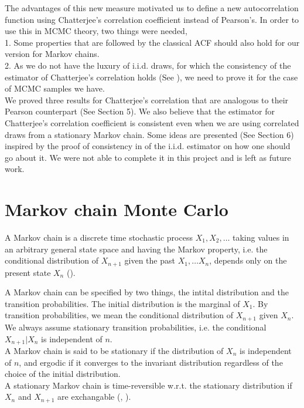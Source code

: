 \documentclass{article}
\begin{document}
	The advantages of this new measure motivated us to define a new autocorrelation function using Chatterjee's correlation coefficient instead of Pearson's.
	In order to use this in MCMC theory, two things were needed,\\
	1. Some properties that are followed by the classical ACF should also hold for our version for Markov chains.\\
	2. As we do not have the luxury of i.i.d. draws, for which the consistency of the estimator of Chatterjee's correlation holds (See \cite{chatterjee2020sourav}),
		we need to prove it for the case of MCMC samples we have.\\
	We proved three results for Chatterjee's correlation that are analogous to their Pearson counterpart (See Section 5).
	We also believe that the estimator for Chatterjee's correlation coefficient is consistent even when we are using correlated draws from a stationary Markov chain.
	Some ideas are presented (See Section 6) inspired by the proof of consistency in \cite{chatterjee2020sourav} of the i.i.d. estimator on how one should go about it.
	We were not able to complete it in this project and is left as future work.

\section{Markov chain Monte Carlo}
	A Markov chain is a discrete time stochastic process $X_1, X_2, \dots$ taking values in an arbitrary general state space and having the Markov property,
	i.e. the conditional distribution of $X_{n+1}$ given the past $X_1, \dots X_n$, depends only on the present state $X_n$ (\cite{vats2017multivariate}).

	A Markov chain can be specified by two things, the intital distribution and the transition probabilities.
	The initial distribution is the marginal of $X_1$. By transition probabilities, we mean the conditional distribution of $X_{n+1}$ given $X_n$.
	We always assume stationary transition probabilities, i.e. the conditional $X_{n+1}|X_n$ is independent of $n$.\\
	A Markov chain is said to be stationary if the distribution of $X_n$ is independent of $n$,
	and ergodic if it converges to the invariant distribution regardless of the choice of the initial distribution.\\
	A stationary Markov chain is time-reversible w.r.t. the stationary distribution if $X_n$ and $X_{n+1}$ are exchangable (\cite{geyer2005charles}, \cite{mcmc2011handbook}).
\end{document}
